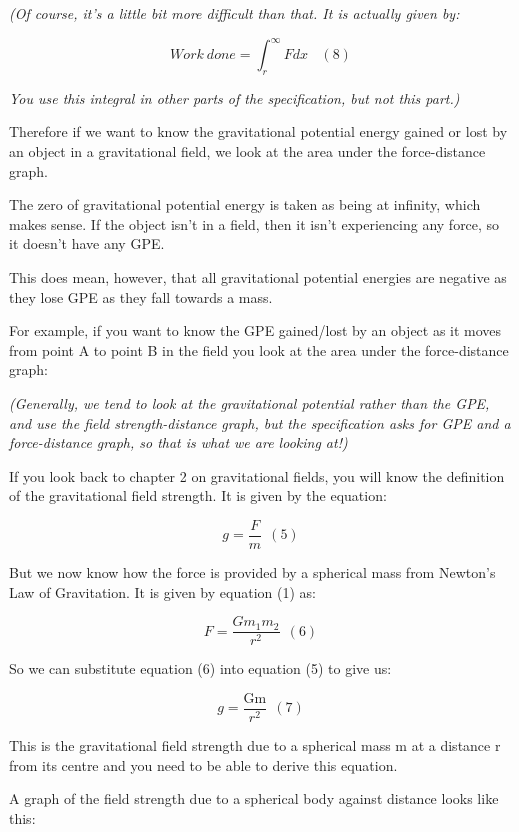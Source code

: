 \documentclass[main.tex]{subfiles}
\begin{document}
\emph{(Of course, it's a little bit more difficult than that. It is
actually given by:}

\[Work\ done = \int_{r}^{\infty}{F{dx\ \ \ \ (8)}}\]

\emph{You use this integral in other parts of the specification, but not
this part.)}

Therefore if we want to know the gravitational potential energy gained
or lost by an object in a gravitational field, we look at the area under
the force-distance graph.

The zero of gravitational potential energy is taken as being at
infinity, which makes sense. If the object isn't in a field, then it
isn't experiencing any force, so it doesn't have any GPE.

This does mean, however, that all gravitational potential energies are
negative as they lose GPE as they fall towards a mass.

For example, if you want to know the GPE gained/lost by an object as it
moves from point A to point B in the field you look at the area under
the force-distance graph:

\emph{(Generally, we tend to look at the gravitational potential rather
than the GPE, and use the field strength-distance graph, but the
specification asks for GPE and a force-distance graph, so that is what
we are looking at!)}


If you look back to chapter 2 on gravitational fields, you will know the
definition of the gravitational field strength. It is given by the
equation:

\[g = \frac{F}{m}\ \ (5)\]

But we now know how the force is provided by a spherical mass from
Newton's Law of Gravitation. It is given by equation (1) as:

\[F = \frac{Gm_{1}m_{2}}{r^{2}}\ \ (6)\]

So we can substitute equation (6) into equation (5) to give us:

\[g = \frac{\text{Gm}}{r^{2}}\ \ (7)\]

This is the gravitational field strength due to a spherical mass m at a
distance r from its centre and you need to be able to derive this
equation.

A graph of the field strength due to a spherical body against distance
looks like this:
\end{document}
